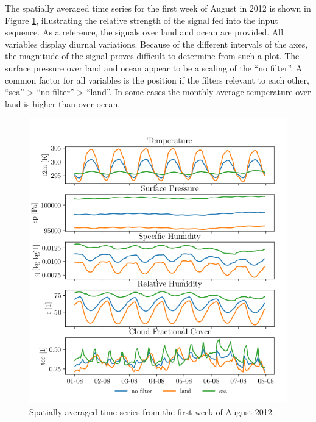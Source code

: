 The spatially averaged time series for the first week of August in 2012 is shown in Figure \ref{fig:first_week_august_2012}, illustrating the relative strength of the signal fed into the input sequence. As a reference, the signals over land and ocean are provided. All variables display diurnal variations. Because of the different intervals of the axes, the magnitude of the signal proves difficult to determine from such a plot. The surface pressure over land and ocean appear to be a scaling of the ``no filter''. A common factor for all variables is the position if the filters relevant to each other, ``sea'' > ``no filter'' > ``land''. In some cases the monthly average temperature over land is higher than over ocean.
\begin{figure}[ht]
    \centering
    \includegraphics{python_figs/spatially_averaged_one_week_from_2012-08-01.png}
    \caption{Spatially averaged time series from the first week of August 2012.}
    \label{fig:first_week_august_2012}
\end{figure}


